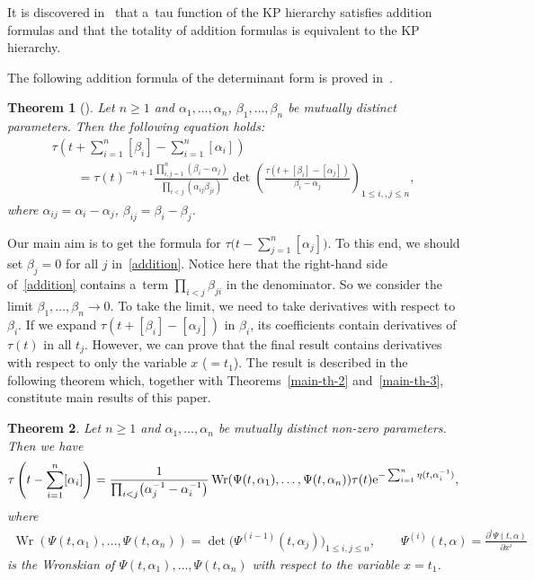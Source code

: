 \documentclass[10pt,a4paper]{amsart}
\numberwithin{equation}{section}
\newtheorem{Theorem}{Theorem}[section]
\theoremstyle{definition}
\begin{document}
It is discovered in~\cite{SS} that a~tau function of the KP hierarchy
satisfies addition formulas and that the totality of addition formulas is equivalent to the KP hierarchy.


The following addition formula of the determinant form is proved in~\cite{Shigyo2013}.

\begin{Theorem}[\cite{Shigyo2013}]
Let $n\geq 1$ and $\alpha_1,\dots ,\alpha_n$, $\beta_1,\dots ,\beta_n$ be mutually distinct parameters.
Then the following equation holds:
\begin{gather}
\tau\left(t+\sum_{i=1}^n[\beta_i]-\sum_{i=1}^n[\alpha_i]\right)\nonumber\\
\qquad
=\tau(t)^{-n+1}
\frac{\prod_{i,j=1}^n(\beta_i-\alpha_j)}{\prod_{i<j}(\alpha_{ij}\beta_{ji})}
\det\left(\frac{\tau(t+[\beta_i]-[\alpha_j])}{\beta_i-\alpha_j}\right)_{1\leq i,,j\leq n},
\label{addition}
\end{gather}
where $\alpha_{ij}=\alpha_i-\alpha_j$, $\beta_{ij}=\beta_i-\beta_j$.
\end{Theorem}

Our main aim is to get the formula for $ \tau\bigl(t-\sum_{j=1}^n[\alpha_j]\bigr)$.
To this end, we should set $\beta_j=0$ for all $j$ in~\eqref{addition}.
Notice here that the right-hand side of~\eqref{addition} contains a~term $\prod_{i<j}\beta_{ji}$ in the denominator. So we consider the limit $\beta_1,\dots ,\beta_n \to 0$.
To take the limit, we need to take derivatives with respect to $\beta_i$.
If we expand $\tau(t+[\beta_i]-[\alpha_j])$
in $\beta_i$, its coefficients contain derivatives of $\tau(t)$ in all $t_j$.
However, we can prove that the final result contains derivatives with respect to only the variable $x$ ($=t_1$). The result is described in the following theorem which,
together with Theorems~\ref{main-th-2} and~\ref{main-th-3}, constitute
 main results of this paper.

\begin{Theorem}\label{main-th}
Let $n\geq 1$ and $\alpha_1,\dots ,\alpha_n$ be mutually distinct non-zero parameters. Then we have
\[
\tau\left(t-\sum_{i=1}^n[\alpha_i]\right)
=\frac{1}{\prod_{i<j}\bigl(\alpha_j^{-1}-\alpha_i^{-1}\bigr)}
\operatorname{Wr}(\Psi(t,\alpha_1),\dots ,\Psi(t,\alpha_n))\tau(t){\rm e}^{-\sum_{i=1}^n\eta(t,\alpha_i^{-1})},
\]
where
\begin{gather*}
\operatorname{Wr}(\Psi(t,\alpha_1),\dots ,\Psi(t,\alpha_n))=\det\bigl(\Psi^{(i-1)}(t,\alpha_j)\bigr)_{1\leq i,j\leq n},
\qquad
\Psi^{(i)}(t,\alpha)=\frac{\partial^i \Psi(t,\alpha)}{\partial x^i}
\end{gather*}
is the Wronskian of $\Psi(t,\alpha_1),\dots ,\Psi(t,\alpha_n)$ with respect to the variable $x=t_1$.
\end{Theorem}
\end{document}
